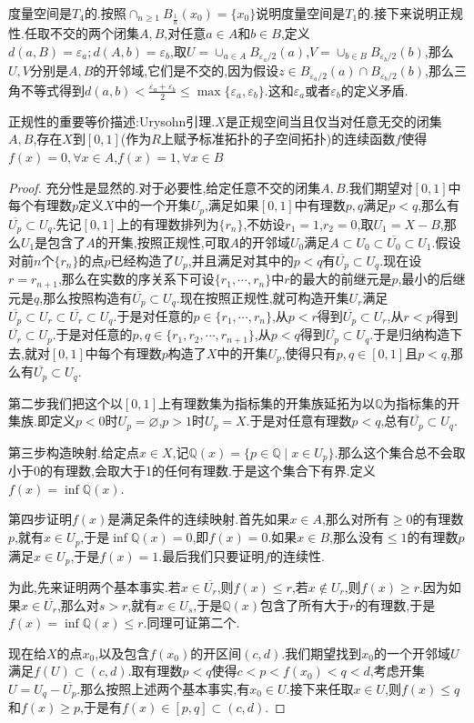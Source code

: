 度量空间是$T_4$的.按照$\cap_{n\ge1}B_{\frac{1}{n}}(x_0)=\{x_0\}$说明度量空间是$T_1$的.接下来说明正规性.任取不交的两个闭集$A,B$,对任意$a\in A$和$b\in B$,定义 $d(a,B)=\varepsilon_a;d(A,b)=\varepsilon_b$,取$U=\cup_{a\in A}B_{\varepsilon_a/2}(a)$,$V=\cup_{b\in B}B_{\varepsilon_b/2}(b)$,那么$U,V$分别是$A,B$的开邻域,它们是不交的,因为假设$z\in B_{\varepsilon_a/2}(a)\cap B_{\varepsilon_b/2}(b)$,那么三角不等式得到$d(a,b)<\frac{\varepsilon_a+\varepsilon_b}{2}\le\max\{\varepsilon_a,\varepsilon_b\}$.这和$\varepsilon_a$或者$\varepsilon_b$的定义矛盾.

正规性的重要等价描述:Urysohn引理.$X$是正规空间当且仅当对任意无交的闭集$A,B$,存在$X$到$[0,1]$(作为$R$上赋予标准拓扑的子空间拓扑)的连续函数$f$使得$f(x)=0,\forall x\in A$,$f(x)=1,\forall x\in B$
\begin{proof}
	
	充分性是显然的.对于必要性,给定任意不交的闭集$A,B$.我们期望对$[0,1]$中每个有理数$p$定义$X$中的一个开集$U_p$,满足如果$[0,1]$中有理数$p,q$满足$p<q$,那么有$\overline{U_p}\subset U_q$.先记$[0,1]$上的有理数排列为$\{r_n\}$,不妨设$r_1=1$,$r_2=0$,取$U_1=X-B$,那么$U_1$是包含了$A$的开集,按照正规性,可取$A$的开邻域$U_0$满足$A\subset U_0\subset\overline{U_0}\subset U_1$.假设对前$n$个$\{r_n\}$的点$p$已经构造了$U_p$,并且满足对其中的$p<q$有$\overline{U_p}\subset U_q$.现在设$r=r_{n+1}$,那么在实数的序关系下可设$\{r_1,\cdots,r_n\}$中$r$的最大的前继元是$p$,最小的后继元是$q$,那么按照构造有$\overline{U_p}\subset U_q$.现在按照正规性,就可构造开集$U_r$满足$\overline{U_p}\subset U_r\subset\overline{U_r}\subset U_q$.于是对任意的$p\in\{r_1,\cdots,r_n\}$,从$p<r$得到$\overline{U_p}\subset U_r$,从$r<p$得到$\overline{U_r}\subset U_p$.于是对任意的$p,q\in\{r_1,r_2,\cdots,r_{n+1}\}$,从$p<q$得到$\overline{U_p}\subset U_q$.于是归纳构造下去,就对$[0,1]$中每个有理数$p$构造了$X$中的开集$U_p$,使得只有$p,q\in[0,1]$且$p<q$,那么有$\overline{U_p}\subset U_q$.
	
	第二步我们把这个以$[0,1]$上有理数集为指标集的开集族延拓为以$\mathbb{Q}$为指标集的开集族.即定义$p<0$时$U_p=\varnothing$,$p>1$时$U_p=X$.于是对任意有理数$p<q$,总有$\overline{U_p}\subset U_q$.
	
	第三步构造映射.给定点$x\in X$,记$\mathbb{Q}(x)=\{p\in\mathbb{Q}\mid x\in U_p\}$.那么这个集合总不会取小于0的有理数,会取大于1的任何有理数.于是这个集合下有界.定义$f(x)=\inf\mathbb{Q}(x)$.
	
	第四步证明$f(x)$是满足条件的连续映射.首先如果$x\in A$,那么对所有$\ge0$的有理数$p$,就有$x\in U_p$,于是$\inf\mathbb{Q}(x)=0$,即$f(x)=0$.如果$x\in B$,那么没有$\le1$的有理数$p$满足$x\in U_p$,于是$f(x)=1$.最后我们只要证明$f$的连续性.
	
	为此,先来证明两个基本事实.若$x\in\overline{U_r}$,则$f(x)\le r$,若$x\not\in U_r$,则$f(x)\ge r$.因为如果$x\in\overline{U_r}$,那么对$s>r$,就有$x\in U_s$,于是$\mathbb{Q}(x)$包含了所有大于$r$的有理数,于是$f(x)=\inf\mathbb{Q}(x)\le r$.同理可证第二个.
	
	现在给$X$的点$x_0$,以及包含$f(x_0)$的开区间$(c,d)$.我们期望找到$x_0$的一个开邻域$U$满足$f(U)\subset(c,d)$.取有理数$p<q$使得$c<p<f(x_0)<q<d$,考虑开集$U=U_q-\overline{U_p}$.那么按照上述两个基本事实,有$x_0\in U$.接下来任取$x\in U$,则$f(x)\le q$和$f(x)\ge p$,于是有$f(x)\in[p,q]\subset(c,d)$.
\end{proof}


